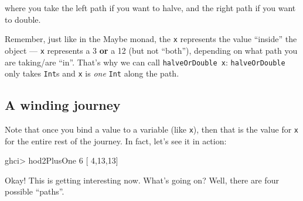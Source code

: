 \documentclass[]{article}
\newenvironment{Shaded}{}{}
\newcommand{\CommentTok}[1]{\textcolor[rgb]{0.38,0.63,0.69}{\textit{#1}}}
\newcommand{\DataTypeTok}[1]{\textcolor[rgb]{0.56,0.13,0.00}{#1}}
\newcommand{\DecValTok}[1]{\textcolor[rgb]{0.25,0.63,0.44}{#1}}
\newcommand{\FunctionTok}[1]{\textcolor[rgb]{0.02,0.16,0.49}{#1}}
\newcommand{\KeywordTok}[1]{\textcolor[rgb]{0.00,0.44,0.13}{\textbf{#1}}}
\newcommand{\NormalTok}[1]{#1}
\newcommand{\OperatorTok}[1]{\textcolor[rgb]{0.40,0.40,0.40}{#1}}
\newcommand{\OtherTok}[1]{\textcolor[rgb]{0.00,0.44,0.13}{#1}}
\begin{document}
where you take the left path if you want to halve, and the right path if you
want to double.

Remember, just like in the Maybe monad, the \texttt{x} represents the value
``inside'' the object --- \texttt{x} represents a 3 \textbf{or} a 12 (but not
``both''), depending on what path you are taking/are ``in''. That's why we can
call \texttt{halveOrDouble\ x}: \texttt{halveOrDouble} only takes \texttt{Int}s
and \texttt{x} is \emph{one} \texttt{Int} along the path.

\subsection{A winding journey}\label{a-winding-journey}

Note that once you bind a value to a variable (like \texttt{x}), then that is
the value for \texttt{x} for the entire rest of the journey. In fact, let's see
it in action:

\begin{Shaded}
\end{Shaded}

\begin{Shaded}
\begin{Highlighting}[]
\NormalTok{ghci}\OperatorTok{\textgreater{}}\NormalTok{ hod2PlusOne }\DecValTok{6}
\NormalTok{[   }\DecValTok{4}\NormalTok{,}\DecValTok{13}\NormalTok{,}\DecValTok{13}\NormalTok{]}
\end{Highlighting}
\end{Shaded}

Okay! This is getting interesting now. What's going on? Well, there are four
possible ``paths''.
\end{document}
